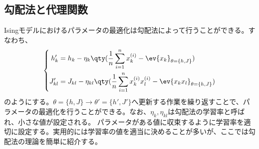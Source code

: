 \documentclass[a4paper,11pt,uplatex]{jsarticle}%
\begin{document}
\subsection{勾配法と代理関数}
Isingモデルにおけるパラメータの最適化は勾配法によって行うことができる。すなわち、
\begin{equation}
  \left\{
  \begin{aligned}
    h_k'    & = h_k - \eta_k\qty(\frac{1}{n}\sum_{i=1}^{n}x_{k}^{(i)}-\ev{x_k}_{\theta=\{h,J\}})                     \\
    J_{kl}' & = J_{kl} - \eta_{kl}\qty(\frac{1}{n}\sum_{i=1}^{n}x_{k}^{(i)}x_{l}^{(i)}-\ev{x_kx_l}_{\theta=\{h,J\}})
  \end{aligned}
  \right.
\end{equation}
のようにする。$\theta=\{h,J\}\to\theta' = \{h',J'\}$へ更新する作業を繰り返すことで、パラメータの最適化を行うことができる。なお、$\eta_k,\eta_{kl}$は勾配法の学習率と呼ばれ、小さな値が設定される。
パラメータがある値に収束するように学習率を適切に設定する。実用的には学習率の値を適当に決めることが多いが、ここでは勾配法の理論を簡単に紹介する。
\end{document}
